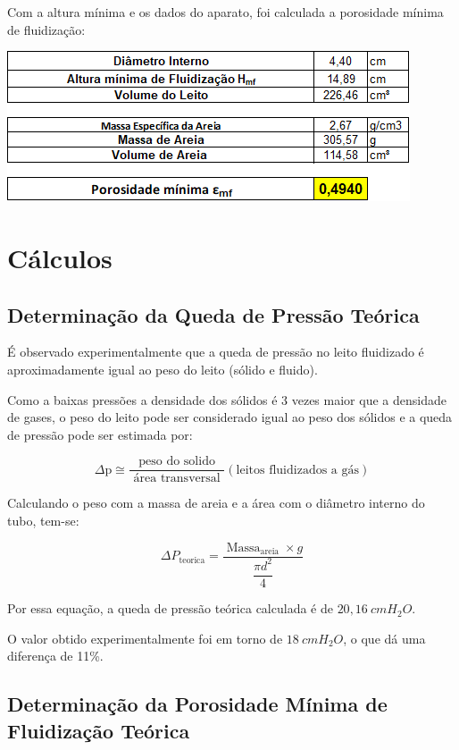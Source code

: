 Com a altura mínima e os dados do aparato, foi calculada a porosidade mínima de fluidização:


\includegraphics[scale=1, trim={0 0 0 0}]{figuras/ladeq/fluid/table3}


\chapter{Cálculos}


\section{Determinação da Queda de Pressão Teórica}

É observado experimentalmente que a queda de pressão no leito fluidizado é aproximadamente igual ao peso do leito (sólido e fluido). 

Como a baixas pressões a densidade dos sólidos é 3 vezes maior que a densidade de gases, o peso do leito pode ser considerado igual ao peso dos sólidos e a queda de pressão pode ser estimada por:

\begin{equation}\label{key}
\Delta \mathrm{p} \cong \frac{\text { peso do solido }}{\text { área transversal }} (\text{leitos fluidizados a gás})
\end{equation}

Calculando o peso com a massa de areia e a área com o diâmetro interno do tubo, tem-se:

\begin{equation}\label{key}
\Delta P_{\text {teorica}}=\dfrac{\operatorname{Massa} _{\text {areia}} \times g}{\dfrac{\pi d^{2}}{4}}
\end{equation}

Por essa equação, a queda de pressão teórica calculada é de $ 20,16 \ cmH_{2}O $.

O valor obtido experimentalmente foi em torno de $ 18 \ cmH_{2}O $, o que dá uma diferença de 11\%.

\section{Determinação da Porosidade Mínima de Fluidização Teórica}

